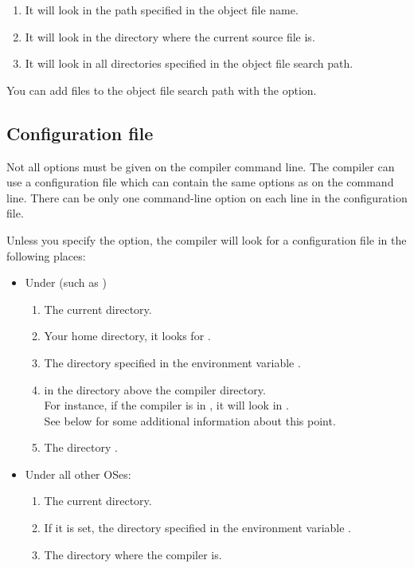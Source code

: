 \begin{enumerate}
\item It will look in the path specified in the object file name.
\item It will look in the directory where the current source file is.
\item It will look in all directories specified in the object file search path.
\end{enumerate}
You can add files to the object file search path with the  option.

\subsection{Configuration file}
\label{searchconfig}

Not all options must be given on the compiler command line. The compiler
can use a configuration file which can contain the same options as on the
command line. There can be only one command-line option on each line in
the configuration file.

Unless you specify the  option, the compiler will look
for a configuration file  in the following places:

\begin{itemize}
\item Under \unix (such as \linux)
\begin{enumerate}
\item The current directory.
\item Your home directory, it looks for .
\item The directory specified in the environment
variable .
\item in the  directory above the compiler directory.\\
For instance, if the compiler is in , it will look in
. \\
See below for some additional information about this point.

\item The directory .
\end{enumerate}
\item Under all other OSes:
\begin{enumerate}
\item The current directory.
\item If it is set, the directory specified in the environment variable
.
\item The directory where the compiler is.
\end{enumerate}
\end{itemize}

